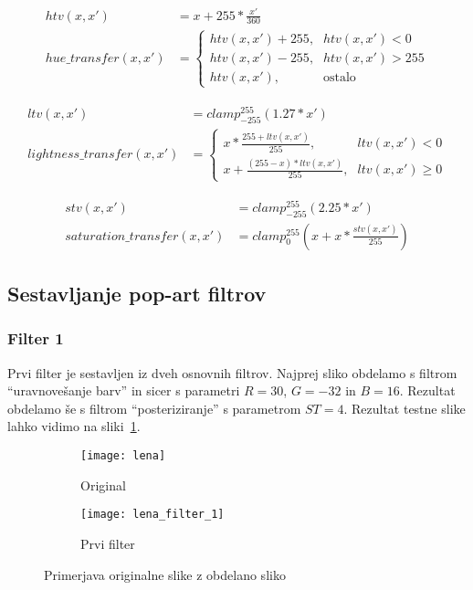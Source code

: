 \begin{align}
htv(x, x') &= x + 255 * \frac{x'}{360} \nonumber \\
hue\_transfer(x, x') &=
\begin{cases}
    htv(x, x') + 255 \text{,}& htv(x, x') < 0 \\
    htv(x, x') - 255 \text{,}& htv(x, x') > 255 \\
    htv(x, x') \text{,}& \text{ostalo}
\end{cases}
\end{align}

\begin{align}
ltv(x, x') &= clamp_{-255}^{255}(1.27 * x') \nonumber \\
lightness\_transfer(x, x') &=
\begin{cases}
    x * \frac{255 + ltv(x, x')}{255} \text{,}& ltv(x, x') < 0 \\
    x + \frac{(255 - x) * ltv(x, x')}{255} \text{,}& ltv(x, x') \geq 0
\end{cases}
\end{align}

\begin{align}
stv(x, x') &= clamp_{-255}^{255}(2.25 * x') \nonumber \\
saturation\_transfer(x, x') &= clamp_{0}^{255}(x + x * \frac{stv(x, x')}{255})
\end{align}

\subsection{Sestavljanje pop-art filtrov}

\subsubsection*{Filter 1}
Prvi filter je sestavljen iz dveh osnovnih filtrov. Najprej sliko obdelamo s
filtrom ``uravnovešanje barv'' in sicer s parametri $R = 30$, $G = -32$ in
$B = 16$. Rezultat obdelamo še s filtrom ``posteriziranje'' s parametrom
$ST =4$. Rezultat testne slike lahko vidimo na sliki~\ref{fig:lena_filter_1}.

\begin{figure}[!ht]
    \centering
    \begin{subfigure}[b]{0.4\textwidth}
        \texttt{[image: lena]}
        \caption{Original}
    \end{subfigure}
    \begin{subfigure}[b]{0.4\textwidth}
        \texttt{[image: lena\_filter\_1]}
        \caption{Prvi filter}
    \end{subfigure}
    \caption{Primerjava originalne slike z obdelano sliko}
    \label{fig:lena_filter_1}
\end{figure}



